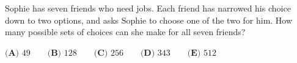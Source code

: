 Sophie has seven friends who need jobs. Each friend has narrowed his choice down to two options, and asks Sophie to choose one of the two for him. How many possible sets of choices can she make for all seven friends?

$\textbf{(A) }49\qquad\textbf{(B) }128\qquad\textbf{(C) }256\qquad\textbf{(D) }343\qquad\textbf{(E) }512$
